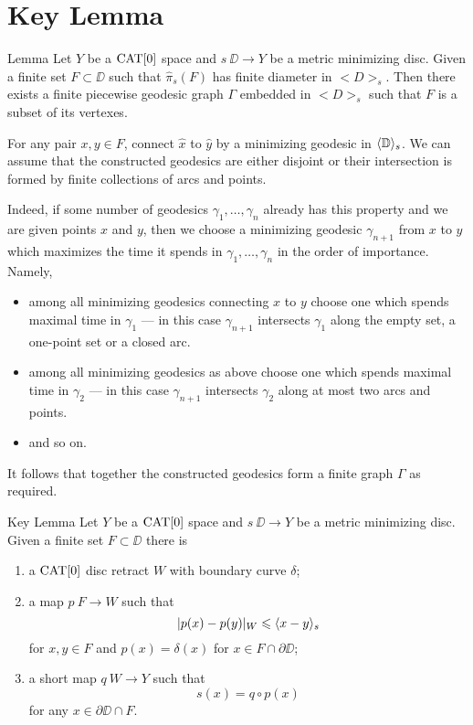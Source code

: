 \section{Key Lemma}\label{Key Lemma}


\begin{thm}{Lemma}\label{lem:graph}
Let $Y$ be a $\mathop{\rm CAT}\nolimits[0]$ space and $s\:\DD\to Y$ 
be a metric minimizing disc.
Given a finite set $F\subset \DD$ such that $\hat\pi_s(F)$ has finite
diameter in $<D>_s$. Then
there exists a finite piecewise geodesic graph $\Gamma$ embedded in $<D>_s$ such that 
$F$ is a subset of its vertexes.
\end{thm} 

For any pair $x,y\in F$, connect $\hat x$ to $\hat y$ by a minimizing geodesic in $\langle\mathbb{D}\rangle_s$. 
We can assume that the constructed geodesics 
are either disjoint or their intersection is formed by finite collections of arcs and points.

Indeed, if some number of geodesics $\gamma_1,\dots,\gamma_n$ already has this property and we are given points $x$ and $y$, then
we choose a minimizing geodesic $\gamma_{n+1}$ from $x$ to $y$ which maximizes the time it spends in $\gamma_1,\dots,\gamma_n$  
in the order of importance.
Namely, 
\begin{itemize}
\item  among all minimizing geodesics connecting $x$ to $y$
choose one which spends maximal time in $\gamma_1$ --- in this case $\gamma_{n+1}$ intersects $\gamma_1$ along the empty set, 
a one-point set or a closed arc.
\item among all minimizing geodesics as above
choose one which spends maximal time in $\gamma_2$ --- in this case $\gamma_{n+1}$ intersects $\gamma_2$ along at most two arcs and points.
\item and so on.
\end{itemize}


It follows that together the constructed geodesics form a finite graph $\Gamma$ as required.
\qeds



\begin{thm}{Key Lemma}\label{lem:key}
Let $Y$ be a $\mathop{\rm CAT}\nolimits[0]$ space and $s\:\DD\to Y$ 
be a metric minimizing disc.
Given a finite set $F\subset \DD$
there is 
\begin{enumerate}[(1)]
	\item a $\mathop{\rm CAT}\nolimits[0]$ disc retract $W$ with boundary curve $\delta$;
	\item a map $p\:F\to W$ such that
\[|p(x)-p(y)|_W\leqslant \langle x-y\rangle_s\] 
for $x,y\in F$ and $p(x)=\delta(x)$ for $x\in F\cap \partial\DD$;
  \item a short map $q\:W\to Y$ such that
\[s(x)=q\circ p(x)\] 
for any $x\in\partial\DD\cap F$.
\end{enumerate}
 
\end{thm} 

